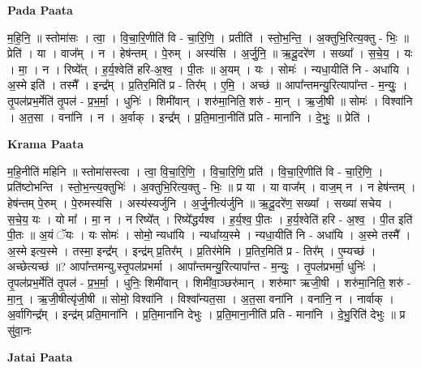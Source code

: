 \documentclass[17pt]{extarticle}
\begin{document}
\textbf{Pada Paata} \newline

म॒हि॒नि॒ ॥ स्तोमा॑सः । त्वा॒ । वि॒चा॒रि॒णीति॑ वि - चा॒रि॒णि॒ । प्रतीति॑ । स्तो॒भ॒न्ति॒ । अ॒क्तुभि॒रित्य॒क्तु - भिः॒ ॥ प्रेति॑ । या । वाज᳚म् । न । हेष॑न्तम् । पे॒रुम् । अस्य॑सि । अ॒र्जु॒नि॒ ॥ ऋ॒दू॒दरे॑ण । सख्या᳚ । स॒चे॒य॒ । यः । मा॒ । न । रिष्ये᳚त् । ह॒र्य॒श्वेति॑ हरि-अ॒श्व॒ । पी॒तः ॥ अ॒यम् । यः । सोमः॑ । न्यधा॒यीति॑ नि - अधा॑यि । अ॒स्मे इति॑ । तस्मै᳚ । इन्द्र᳚म् । प्र॒तिर॒मिति॑ प्र - तिर᳚म् । ए॒मि॒ । अच्छ॑ ॥ आपा᳚न्तमन्यु॒रित्यापा᳚न्त - म॒न्युः॒ । तृ॒पल॑प्रभ॒र्मेति॑ तृ॒पल॑ - प्र॒भ॒र्मा॒ । धुनिः॑ । शिमी॑वान् । शरु॑मा॒निति॒ शरु॑ - मा॒न् । ऋ॒जी॒षी ॥ सोमः॑ । विश्वा॑नि । अ॒त॒सा । वना॑नि । न । अ॒र्वाक् । इन्द्र᳚म् । प्र॒ति॒माना॒नीति॑ प्रति - माना॑नि । दे॒भुः॒ ॥ प्रेति॑ ।  \newline


\textbf{Krama Paata} \newline

म॒हि॒नीति॑ महिनि ॥ स्तोमा॑सस्त्वा । त्वा॒ वि॒चा॒रि॒णि॒ । वि॒चा॒रि॒णि॒ प्रति॑ । वि॒चा॒रि॒णीति॑ वि - चा॒रि॒णि॒ । प्रति॑ष्टोभन्ति । स्तो॒भ॒न्त्य॒क्तुभिः॑ । अ॒क्तुभि॒रित्य॒क्तु - भिः॒ ॥ प्र या । या वाज᳚म् । वाज॒म् न । न हेष॑न्तम् । हेष॑न्तम् पे॒रुम् । पे॒रुमस्य॑सि । अस्य॑स्यर्जुनि । अ॒र्जु॒नीत्य॑र्जुनि ॥ ऋ॒दू॒दरे॑ण॒ सख्या᳚ । सख्या॑ सचेय । स॒चे॒य॒ यः । यो मा᳚ । मा॒ न । न रिष्ये᳚त् । रिष्ये᳚द्धर्यश्व । ह॒र्य॒श्व॒ पी॒तः । ह॒र्य॒श्वेति॑ हरि - अ॒श्व॒ । पी॒त इति॑ पी॒तः ॥ अ॒यं ॅयः । यः सोमः॑ । सोमो॒ न्यधा॑यि । न्यधा᳚य्य॒स्मे । न्यधा॒यीति॑ नि - अधा॑यि । अ॒स्मे तस्मै᳚ । अ॒स्मे इत्य॒स्मे । तस्मा॒ इन्द्र᳚म् । इन्द्र॑म् प्र॒तिर᳚म् । प्र॒तिर॑मेमि । प्र॒तिर॒मिति॑ प्र - तिर᳚म् । ए॒म्यच्छ॑ । अच्छेत्यच्छ॑ ॥? आपा᳚न्तमन्यु,स्तृ॒पल॑प्रभर्मा । आपा᳚न्तमन्यु॒रित्यापा᳚न्त - म॒न्युः॒ । तृ॒पल॑प्रभर्मा॒ धुनिः॑ । तृ॒पल॑प्रभ॒र्मेति॑ तृ॒पल॑ - प्र॒भ॒र्मा॒ । धुनिः॒ शिमी॑वान् । शिमी॑वा॒ञ्छरु॑मान् । शरु॑माꣳ ऋजी॒षी । शरु॑मा॒निति॒ शरु॑ - मा॒न्॒ । ऋ॒जी॒षीत्यृ॑जी॒षी ॥ सोमो॒ विश्वा॑नि । विश्वा᳚न्यत॒सा । अ॒त॒सा वना॑नि । वना॑नि॒ न । नार्वाक् । अ॒र्वागिन्द्र᳚म् । इन्द्र॑म् प्रति॒माना॑नि । प्र॒ति॒माना॑नि देभुः । प्र॒ति॒माना॒नीति॑ प्रति - माना॑नि । दे॒भु॒रिति॑ देभुः ॥ प्र सु॑वा॒नः \newline

\textbf{Jatai Paata} \newline
\end{document}
